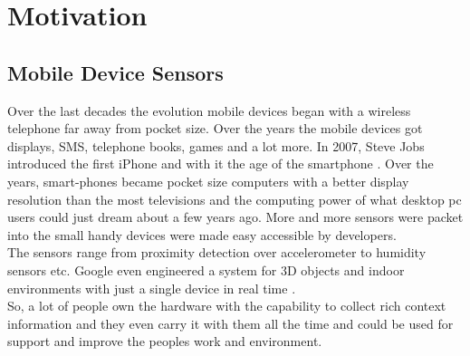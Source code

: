 \section{Motivation}

\subsection{Mobile Device Sensors}
Over the last decades the evolution mobile devices began with a wireless telephone far away from pocket size. Over the years the mobile devices got displays, SMS, telephone books, games and a lot more. In 2007, Steve Jobs introduced the first iPhone and with it the age of the smartphone  \cite{laugesen2010factors}. Over the years, smart-phones became pocket size computers with a better display resolution than the most televisions and the computing power of what desktop pc users could just dream about a few years ago. More and more sensors were packet into the small handy devices were made easy accessible by developers.\\
The sensors range from proximity detection over accelerometer to humidity sensors etc. Google even engineered a system for 3D objects and indoor environments with just a single device in real time \cite{schops20153d}.\\
So, a lot of people own the hardware with the capability to collect rich context information and they even carry it with them all the time and could be used for support and improve the peoples work and environment.

